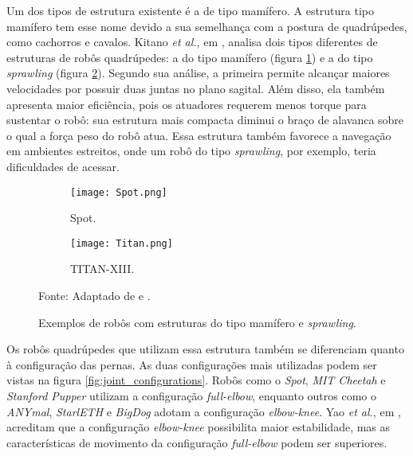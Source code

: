 \documentclass[conference]{IEEEtran}
\begin{document}
Um dos tipos de estrutura existente é a de tipo mamífero. A estrutura tipo mamífero tem esse nome devido a sua semelhança com a postura de quadrúpedes, como cachorros e cavalos. Kitano \textit{et al.}, em \cite{Kitano2016}, analisa dois tipos diferentes de estruturas de robôs quadrúpedes: a do tipo mamífero (figura \ref{fig:robots_structures_b}) e a do tipo \textit{sprawling} (figura \ref{fig:robots_structures_c}). Segundo sua análise, a primeira permite alcançar maiores velocidades por possuir duas juntas no plano sagital. Além disso, ela também apresenta maior eficiência, pois os atuadores requerem menos torque para sustentar o robô: sua estrutura mais compacta diminui o braço de alavanca sobre o qual a força peso do robô atua. Essa estrutura também favorece a navegação em ambientes estreitos, onde um robô do tipo \textit{sprawling}, por exemplo, teria dificuldades de acessar.

\begin{figure}[htbp]
  \centering
  \begin{subfigure}[htbp]{0.23\textwidth}
    \centering
    \texttt{[image: Spot.png]}
    \caption{Spot.}
    \label{fig:robots_structures_b}
  \end{subfigure}
  \begin{subfigure}[htbp]{0.23\textwidth}
    \centering
    \texttt{[image: Titan.png]}
    \caption{TITAN-XIII.}
    \label{fig:robots_structures_c}
  \end{subfigure}
  \centering
  \caption{Exemplos de robôs com estruturas do tipo mamífero e \textit{sprawling}.}
  Fonte: Adaptado de  \cite{Kitano2016} e \cite{SpotImg1}.
  \label{fig:robots_structures}
\end{figure}

Os robôs quadrúpedes que utilizam essa estrutura também se diferenciam quanto à configuração das pernas. As duas configurações mais utilizadas podem ser vistas na figura \ref{fig:joint_configurations}. Robôs como o \textit{Spot}, \textit{MIT Cheetah} e \textit{Stanford Pupper} utilizam a configuração \textit{full-elbow}, enquanto outros como o \textit{ANYmal}, \textit{StarlETH} e \textit{BigDog} adotam a configuração \textit{elbow-knee}. Yao \textit{et al.}, em \cite{Yao2021}, acreditam que a configuração \textit{elbow-knee} possibilita maior estabilidade, mas as características de movimento da configuração \textit{full-elbow} podem ser superiores.
\end{document}

